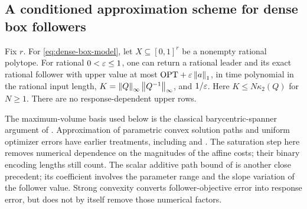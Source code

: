 \subsection{A conditioned approximation scheme for dense box followers}
\label{subsec:conditioned-algorithm}
\begin{theorem}\label{thm:conditioned-grid}
Fix \(r\). For \eqref{eq:dense-box-model}, let \(X\subseteq[0,1]^r\) be a
nonempty rational polytope. For rational \(0<\varepsilon\le1\), one can return a
rational leader and its exact rational follower with upper value at most
\(\mathrm{OPT}+\varepsilon\left\lVert a\right\rVert_1\), in time polynomial in the rational input length,
\(K=\left\lVert Q\right\rVert_\infty\left\lVert Q^{-1}\right\rVert_\infty\), and \(1/\varepsilon\). Here
\(K\le N\kappa_2(Q)\) for \(N\ge1\). There are no response-dependent upper rows.
\end{theorem}
The maximum-volume basis used below is the classical barycentric-spanner
argument of \citet[Proposition~2.2]{AwerbuchKleinberg2004}. Approximation of
parametric convex solution paths and uniform optimizer errors have earlier
treatments, including \citet{GiesenJaggiLaue2012} and
\citet[Theorem~4]{BemporadFilippi2001}. The saturation step here removes
numerical dependence on the magnitudes of the affine costs; their binary
encoding lengths still count.
The scalar additive path bound of \citet[Lemma~4 and Theorem~5]{GiesenEtAl2012}
is another close precedent; its coefficient involves the parameter range and
the slope variation of the follower value. Strong convexity converts
follower-objective error into response error, but does not by itself remove
those numerical factors.

